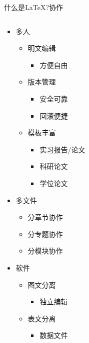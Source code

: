 \documentclass[fontset = none, xcolor=svgnames, t, aspectratio=169]{ctexbeamer}
\begin{document}
\begin{frame}[t]{什么是\LaTeX?}{协作}
  \vspace{-3ex}
  \begin{columns}[t]
  \begin{spacing}{0.7}
    \begin{itemize}
    \item \alert{多人}
      \begin{itemize}
      \item 明文编辑
        \begin{itemize}
        \item 方便自由
        \end{itemize}
      \item 版本管理
        \begin{itemize}
        \item 安全可靠
        \item 回滚便捷
        \end{itemize}
      \item 模板丰富
        \begin{itemize}
        \item 实习报告/论文
        \item 科研论文
        \item 学位论文
        \end{itemize}
      \end{itemize}
    \item \alert{多文件}
      \begin{itemize}
      \item 分章节协作
      \item 分专题协作
      \item 分模块协作
      \end{itemize}
    \item \alert{软件}
      \begin{itemize}
      \item 图文分离
        \begin{itemize}
        \item 独立编辑
        \end{itemize}
      \item 表文分离
        \begin{itemize}
        \item 数据文件
        \end{itemize}
      \end{itemize}
    \end{itemize}
  \end{spacing}
  \vspace{-2.0ex}
  \begin{center}
    \scalebox{0.5}{
      
    }
  \end{center}
\end{columns}
\end{frame}
\end{document}
